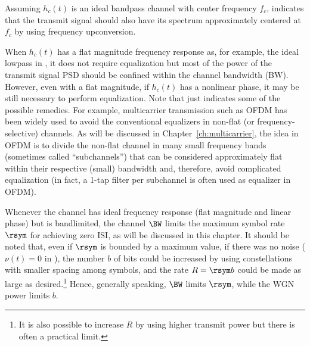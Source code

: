 Assuming $h_c(t)$ is an ideal bandpass channel with center frequency $f_c$,  indicates that the transmit signal should also have its spectrum approximately centered at $f_c$ by using frequency upconversion. 

When $h_c(t)$ has a flat magnitude frequency response as, for example, the ideal lowpass in , it does not require equalization but most of the power of the transmit signal PSD should be confined within the channel bandwidth (BW). However, even with a flat magnitude, if $h_c(t)$ has a nonlinear phase, it may be still necessary to perform equalization. Note that  just indicates some of the possible remedies. For example, multicarrier transmission such as OFDM has been widely used to avoid the conventional equalizers in non-flat (or frequency-selective) channels. As will be discussed in Chapter~\ref{ch:multicarrier}, the idea in OFDM is to divide the non-flat channel in many small frequency bands (sometimes called ``subchannels'') that can be considered approximately flat within their respective (small) bandwidth and, therefore, avoid complicated equalization (in fact, a 1-tap filter per subchannel is often used as equalizer in OFDM).

Whenever the channel has ideal frequency response (flat magnitude and linear phase) but is bandlimited, the channel $\BW$ limits the maximum symbol rate $\rsym$ for achieving zero ISI, as will be discussed in this chapter. It should be noted that, even if $\rsym$ is bounded by a maximum value, if there was no noise ($\nu(t)=0$ in ), the number $b$ of bits could be increased by using constellations with smaller spacing among symbols, and the rate $R = \rsym b$ could be made as large as desired.\footnote{It is also possible to increase $R$ by using
higher transmit power but there is often a practical limit.}
 Hence, generally speaking, $\BW$ limits $\rsym$, while the WGN power limits $b$.


%
%

